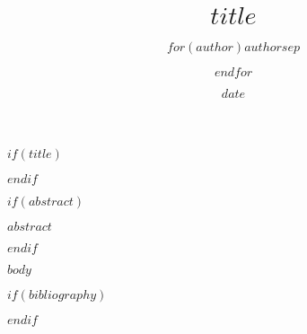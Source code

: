 \documentclass[nofonts]{tufte-handout}
\title{$title$}
\author{$for(author)$$author$$sep$ \and $endfor$}
\date{$date$}
\begin{document}
$if(title)$
\maketitle
$endif$

$if(abstract)$
\begin{fullwidth}
    \vspace{10pt}
    \hfill\textsf{$abstract$}
\end{fullwidth}
$endif$

$body$

$if(bibliography)$


$endif$
\end{document}
